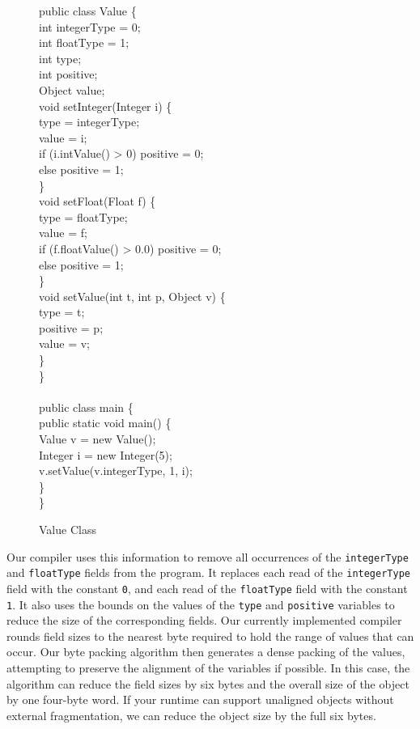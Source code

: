 \documentclass{acmconf}
\begin{document}
\begin{figure}
\begin{samplecode}
public class Value \{ \\
\>int integerType = 0;\\
\>int floatType = 1;\\
\>int type;\\
\>int positive;\\
\>Object value;\\
\>void setInteger(Integer i) \{ \\
\>\>type = integerType;\\
\>\>value = i;\\
\>\>if (i.intValue() > 0) positive = 0;\\
\>\>else positive = 1;\\
\>\}\\
\>void setFloat(Float f) \{ \\
\>\>type = floatType;\\
\>\>value = f;\\
\>\>if (f.floatValue() > 0.0) positive = 0;\\
\>\>else positive = 1;\\
\>\}\\
\>void setValue(int t, int p, Object v) \{ \\
\>\>type = t;\\
\>\>positive = p;\\
\>\>value = v;\\
\>\}\\
\}\\
\\
public class main \{ \\
\>public static void main() \{ \\
\>\>Value v = new Value();\\
\>\>Integer i = new Integer(5);\\
\>\>v.setValue(v.integerType, 1, i);\\
\>\}\\
\}%
\end{samplecode}%
\caption{\label{fig:value} Value Class}
\end{figure}

Our compiler uses this information to remove all occurrences
of the {\tt integerType} and {\tt floatType} fields from the
program. It replaces each read of the {\tt integerType} field
with the constant {\tt 0}, and each read of the {\tt floatType}
field with the constant {\tt 1}. It also uses the bounds on the 
values of the {\tt type} and {\tt positive} variables to reduce the size of the 
corresponding fields. Our currently implemented compiler rounds
field sizes to the nearest byte required to hold the range
of values that can occur. Our byte packing algorithm then 
generates a dense packing of the values, attempting to preserve
the alignment of the variables if possible. In this case, the
algorithm can reduce the field sizes by six bytes and the overall
size of the object by one four-byte word.  If your runtime can support
unaligned objects without external fragmentation, we can reduce the
object size by  the full six bytes.
\end{document}
